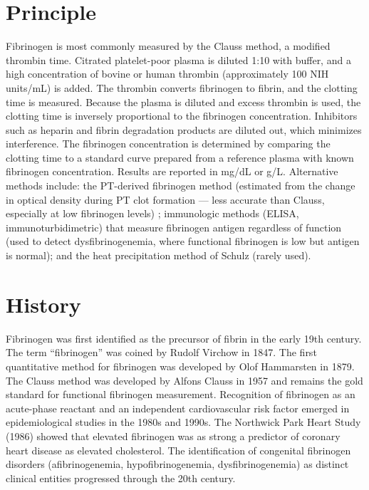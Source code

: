 \section*{Principle}
Fibrinogen is most commonly measured by the Clauss method, a modified thrombin time. Citrated platelet-poor plasma is diluted 1:10 with buffer, and a high concentration of bovine or human thrombin (approximately 100 NIH units/mL) is added. The thrombin converts fibrinogen to fibrin, and the clotting time is measured. Because the plasma is diluted and excess thrombin is used, the clotting time is inversely proportional to the fibrinogen concentration. Inhibitors such as heparin and fibrin degradation products are diluted out, which minimizes interference. The fibrinogen concentration is determined by comparing the clotting time to a standard curve prepared from a reference plasma with known fibrinogen concentration. Results are reported in mg/dL or g/L. Alternative methods include: the PT-derived fibrinogen method (estimated from the change in optical density during PT clot formation --- less accurate than Clauss, especially at low fibrinogen levels) \cite{tietz2023textbook}; immunologic methods (ELISA, immunoturbidimetric) that measure fibrinogen antigen regardless of function (used to detect dysfibrinogenemia, where functional fibrinogen is low but antigen is normal); and the heat precipitation method of Schulz (rarely used).

\section*{History}
Fibrinogen was first identified as the precursor of fibrin in the early 19th century. The term ``fibrinogen'' was coined by Rudolf Virchow in 1847. The first quantitative method for fibrinogen was developed by Olof Hammarsten in 1879. The Clauss method was developed by Alfons Clauss in 1957 and remains the gold standard for functional fibrinogen measurement. Recognition of fibrinogen as an acute-phase reactant and an independent cardiovascular risk factor emerged in epidemiological studies in the 1980s and 1990s. The Northwick Park Heart Study (1986) showed that elevated fibrinogen was as strong a predictor of coronary heart disease as elevated cholesterol. The identification of congenital fibrinogen disorders (afibrinogenemia, hypofibrinogenemia, dysfibrinogenemia) as distinct clinical entities progressed through the 20th century.

